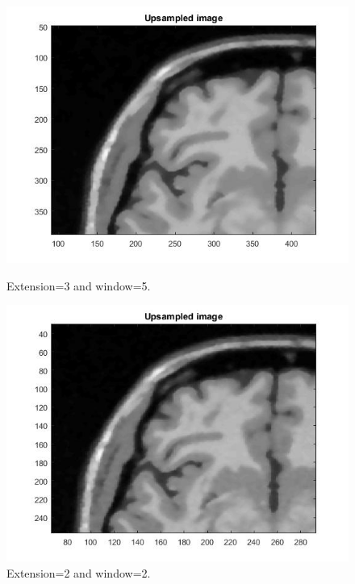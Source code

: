 \begin{itemize}
\begin{figure}[H]
\begin{minipage}{.5\textwidth}
  \centering
  \includegraphics[width=.7\linewidth]{figures/Module_10/Module10_6_b_w5}
 \caption{Extension=3 and window=5.}
  \label{fig: Module10_6_c}
\end{minipage}%
\begin{minipage}{.5\textwidth}
  \centering
  \includegraphics[width=.7\linewidth]{figures/Module_10/Module10_7_b_w2}
 \caption{Extension=2 and window=2.}
  \label{fig: Module10_7_c}
\end{minipage}
\end{figure}

\end{itemize}